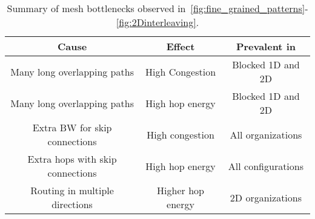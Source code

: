 \begin{scriptsize}
\begin{table}[h]
\begin{scriptsize}
    
    \centering
      \caption{Summary of mesh bottlenecks observed in~\autoref{fig:fine_grained_patterns}-\ref{fig:2Dinterleaving}.}
    \label{table:noc}
    \begin{tabular}{|c|c|c|}
            \hline

        \textbf{Cause} & \textbf{Effect} & \textbf{Prevalent in} \\\hline
       Many long overlapping paths  & High Congestion & Blocked 1D and 2D \\\hline
       Many long overlapping paths  & High hop energy & Blocked 1D and 2D\\\hline
       Extra BW for skip connections & High congestion & All organizations \\\hline
        Extra hops with skip connections & High hop energy & All configurations \\\hline
        Routing in multiple directions & Higher hop energy & 2D organizations\\\hline
    \end{tabular}
  \end{scriptsize}
\end{table}
\end{scriptsize}